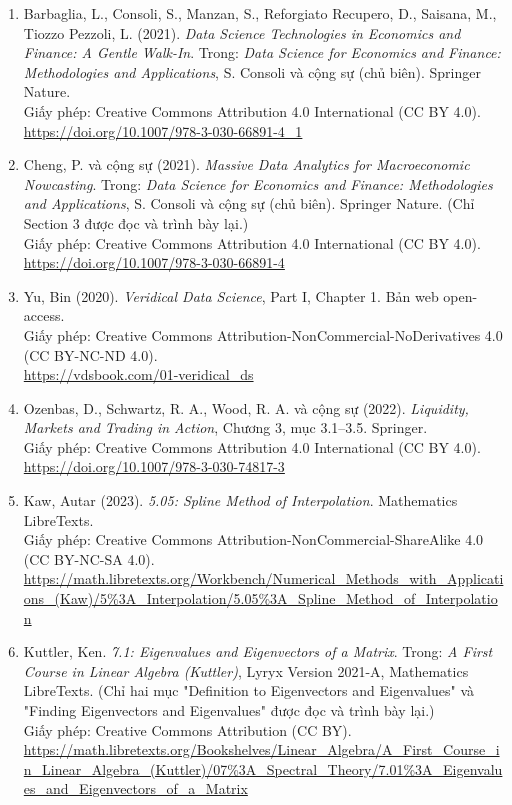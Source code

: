 \begin{enumerate}
  \item Barbaglia, L., Consoli, S., Manzan, S., Reforgiato Recupero, D., Saisana, M., Tiozzo Pezzoli, L. (2021). \emph{Data Science Technologies in Economics and Finance: A Gentle Walk-In}. Trong: \emph{Data Science for Economics and Finance: Methodologies and Applications}, S. Consoli và cộng sự (chủ biên). Springer Nature. \\
  Giấy phép: Creative Commons Attribution 4.0 International (CC BY 4.0). \\
  \url{https://doi.org/10.1007/978-3-030-66891-4_1}

  \item Cheng, P. và cộng sự (2021). \emph{Massive Data Analytics for Macroeconomic Nowcasting}. Trong: \emph{Data Science for Economics and Finance: Methodologies and Applications}, S. Consoli và cộng sự (chủ biên). Springer Nature. (Chỉ Section 3 được đọc và trình bày lại.) \\
  Giấy phép: Creative Commons Attribution 4.0 International (CC BY 4.0). \\
  \url{https://doi.org/10.1007/978-3-030-66891-4}

  \item Yu, Bin (2020). \emph{Veridical Data Science}, Part I, Chapter 1. Bản web open-access. \\
  Giấy phép: Creative Commons Attribution-NonCommercial-NoDerivatives 4.0 (CC BY-NC-ND 4.0). \\
  \url{https://vdsbook.com/01-veridical_ds}

  \item Ozenbas, D., Schwartz, R. A., Wood, R. A. và cộng sự (2022). \emph{Liquidity, Markets and Trading in Action}, Chương 3, mục 3.1--3.5. Springer. \\
  Giấy phép: Creative Commons Attribution 4.0 International (CC BY 4.0). \\
  \url{https://doi.org/10.1007/978-3-030-74817-3}

  \item Kaw, Autar (2023). \emph{5.05: Spline Method of Interpolation}. Mathematics LibreTexts. \\
  Giấy phép: Creative Commons Attribution-NonCommercial-ShareAlike 4.0 (CC BY-NC-SA 4.0). \\
  \url{https://math.libretexts.org/Workbench/Numerical_Methods_with_Applications_(Kaw)/5\%3A_Interpolation/5.05\%3A_Spline_Method_of_Interpolation}

  \item Kuttler, Ken. \emph{7.1: Eigenvalues and Eigenvectors of a Matrix}. Trong: \emph{A First Course in Linear Algebra (Kuttler)}, Lyryx Version 2021-A, Mathematics LibreTexts. (Chỉ hai mục "Definition to Eigenvectors and Eigenvalues" và "Finding Eigenvectors and Eigenvalues" được đọc và trình bày lại.) \\
  Giấy phép: Creative Commons Attribution (CC BY). \\
  \url{https://math.libretexts.org/Bookshelves/Linear_Algebra/A_First_Course_in_Linear_Algebra_(Kuttler)/07\%3A_Spectral_Theory/7.01\%3A_Eigenvalues_and_Eigenvectors_of_a_Matrix}
\end{enumerate}

